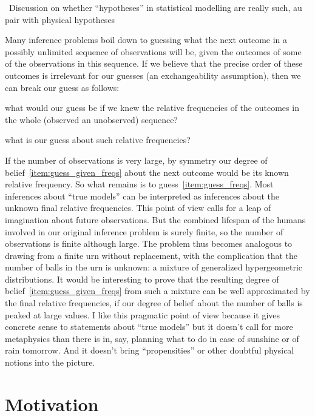 \documentclass[\ifafour a4paper,12pt,\else a5paper,10pt,\fi%
onecolumn,oneside,article,%
british%
]{memoir}
\theoremstyle{remark}
\theoremstyle{innote}
\renewcommand*{\|}{\mathpunct{|}}
\newcommand*{\puzzle}{\maltese}
\newcommand{\mynote}[1]{ {\color{notecolour}\puzzle\ #1}}
\newcommand*{\dob}{degree of belief}
\begin{document}
\mynote{Discussion on whether \enquote{hypotheses} in statistical modelling
are really such, au pair with physical hypotheses}

Many inference problems boil down to guessing what the next outcome in a
possibly unlimited sequence of observations will be, given the outcomes of
some of the observations in this sequence. If we believe that the precise
order of these outcomes is irrelevant for our guesses (an exchangeability
assumption), then we can break our guess as follows:
\begin{enumerate*}[(\alph*)]
\item\label{item:guess_given_freqs}what would our guess be if we knew the
  relative frequencies of the outcomes in the whole (observed an
  unobserved) sequence?
\item\label{item:guess_freqs}what is our guess about such relative frequencies?
\end{enumerate*}
If the number of observations is very large, by symmetry our
\dob~\ref{item:guess_given_freqs} about the next outcome would be its known
relative frequency. So what remains is to guess~\ref{item:guess_freqs}.
Most inferences about \enquote{true models} can be interpreted as
inferences about the unknown final relative frequencies. This point of view
calls for a leap of imagination about future observations. But the combined
lifespan of the humans involved in our original inference problem is surely
finite, so the number of observations is finite although large. The problem
thus becomes analogous to drawing from a finite urn without replacement,
with the complication that the number of balls in the urn is unknown: a
mixture of generalized hypergeometric distributions. It would be
interesting to prove that the resulting \dob~\ref{item:guess_given_freqs}
from such a mixture can be well approximated by the final relative
frequencies, if our \dob\ about the number of balls is peaked at large
values. I like this pragmatic point of view because it gives concrete sense
to statements about \enquote{true models} but it doesn't call for more
metaphysics than there is in, say, planning what to do in case of sunshine or of
rain tomorrow. And it doesn't bring \enquote{propensities} or other
doubtful physical notions into the picture.



\section{Motivation}
\label{sec:motivation}
\end{document}
